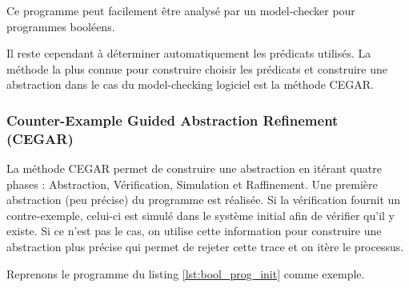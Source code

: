 Ce programme peut facilement être analysé par un model-checker pour programmes
booléens.

Il reste cependant à déterminer automatiquement les prédicats utilisés. La
méthode la plus connue pour construire choisir les prédicats et construire une
abstraction dans le cas du model-checking logiciel est la méthode
\ac{CEGAR}\cite{dsilva_survey_2008}.

\subsubsection{Counter-Example Guided Abstraction Refinement (CEGAR)}

La méthode \ac{CEGAR} permet de construire une abstraction en itérant quatre phases :
Abstraction, Vérification, Simulation et Raffinement. Une première abstraction
(peu précise) du programme est réalisée. Si la vérification fournit un
contre-exemple, celui-ci est simulé dans le système initial afin de vérifier
qu'il y existe. Si ce n'est pas le cas, on utilise cette information pour
construire une abstraction plus précise qui permet de rejeter cette trace et on
itère le processus.

Reprenons le programme du listing \ref{lst:bool_prog_init} comme exemple.

